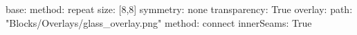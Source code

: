 base:
  method: repeat
  size: [8,8]
  symmetry: none
  transparency: True
overlay:
  path: "Blocks/Overlays/glass_overlay.png"
  method: connect
  innerSeams: True